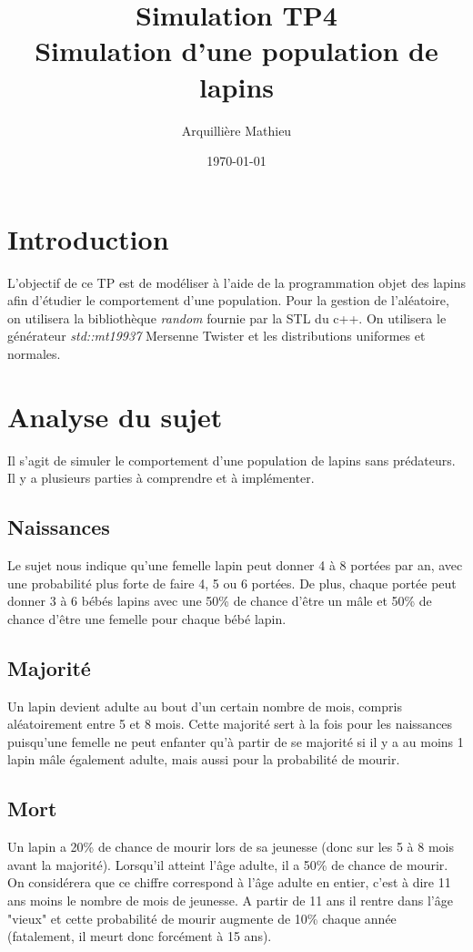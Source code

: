 \documentclass{article}
\title{Simulation TP4\\Simulation d'une population de lapins}
\author{Arquillière Mathieu}
\date{\today}
\begin{document}
\begin{titlepage}
  \maketitle
\end{titlepage}

\tableofcontents
\newpage
\listoffigures
\newpage

\section{Introduction}
L'objectif de ce TP est de modéliser à l'aide de la programmation objet
des lapins afin d'étudier le comportement d'une population. Pour la gestion
de l'aléatoire, on utilisera la bibliothèque \emph{random} fournie par la
STL du c++. On utilisera le générateur \emph{std::mt19937} Mersenne Twister
et les distributions uniformes et normales.

\section{Analyse du sujet}
Il s'agit de simuler le comportement d'une population de lapins sans prédateurs.
Il y a plusieurs parties à comprendre et à implémenter.

\subsection{Naissances}
Le sujet nous indique qu'une femelle lapin peut donner 4 à 8 portées par an, avec
une probabilité plus forte de faire 4, 5 ou 6 portées. De plus, chaque portée
peut donner 3 à 6 bébés lapins avec une 50\% de chance d'être un mâle et 50\%
de chance d'être une femelle pour chaque bébé lapin.

\subsection{Majorité}
Un lapin devient adulte au bout d'un certain nombre de mois, compris
aléatoirement entre 5 et 8 mois. Cette majorité sert à la fois pour les
naissances puisqu'une femelle ne peut enfanter qu'à partir de se majorité
si il y a au moins 1 lapin mâle également adulte, mais aussi pour la
probabilité de mourir.

\subsection{Mort}
Un lapin a 20\% de chance de mourir lors de sa jeunesse (donc sur les 5
à 8 mois avant la majorité). Lorsqu'il atteint l'âge adulte, il a 50\% de
chance de mourir. On considérera que ce chiffre correspond à l'âge adulte
en entier, c'est à dire 11 ans moins le nombre de mois de jeunesse. A partir
de 11 ans il rentre dans l'âge "vieux" et cette probabilité de mourir
augmente de 10\% chaque année (fatalement, il meurt donc forcément à 15 ans).
\end{document}

